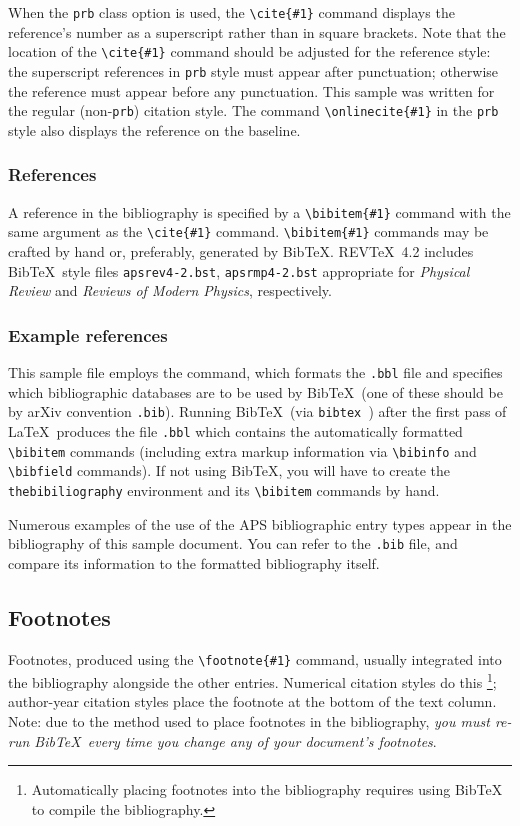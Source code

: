 \documentclass[%
reprint,
amsmath,amssymb,
aps,
]{revtex4-2}
\begin{document}
	When the \verb+prb+ class option is used, the \verb+\cite{#1}+ command
	displays the reference's number as a superscript rather than in
	square brackets. Note that the location of the \verb+\cite{#1}+
	command should be adjusted for the reference style: the superscript
	references in \verb+prb+ style must appear after punctuation;
	otherwise the reference must appear before any punctuation. This
	sample was written for the regular (non-\texttt{prb}) citation style.
	The command \verb+\onlinecite{#1}+ in the \texttt{prb} style also
	displays the reference on the baseline.
	
	\subsubsection{References}
	A reference in the bibliography is specified by a \verb+\bibitem{#1}+ command
	with the same argument as the \verb+\cite{#1}+ command.
	\verb+\bibitem{#1}+ commands may be crafted by hand or, preferably,
	generated by Bib\TeX. 
	REV\TeX~4.2 includes Bib\TeX\ style files
	\verb+apsrev4-2.bst+, \verb+apsrmp4-2.bst+ appropriate for
	\textit{Physical Review} and \textit{Reviews of Modern Physics},
	respectively.
	
	\subsubsection{Example references}
	This sample file employs the \verb++ command, 
	which formats the \texttt{\jobname .bbl} file
	and specifies which bibliographic databases are to be used by Bib\TeX\ 
	(one of these should be by arXiv convention \texttt{\jobname .bib}).
	Running Bib\TeX\ (via \texttt{bibtex \jobname}) 
	after the first pass of \LaTeX\ produces the file
	\texttt{\jobname .bbl} which contains the automatically formatted
	\verb+\bibitem+ commands (including extra markup information via
	\verb+\bibinfo+ and \verb+\bibfield+ commands). 
	If not using Bib\TeX, you will have to create the \verb+thebibiliography+ environment 
	and its \verb+\bibitem+ commands by hand.
	
	Numerous examples of the use of the APS bibliographic entry types appear in the bibliography of this sample document.
	You can refer to the \texttt{\jobname .bib} file, 
	and compare its information to the formatted bibliography itself.
	
	\subsection{Footnotes}%
	Footnotes, produced using the \verb+\footnote{#1}+ command, 
	usually integrated into the bibliography alongside the other entries.
	Numerical citation styles do this%
	\footnote{Automatically placing footnotes into the bibliography requires using BibTeX to compile the bibliography.};
	author-year citation styles place the footnote at the bottom of the text column.
	Note: due to the method used to place footnotes in the bibliography, 
	\emph{you must re-run Bib\TeX\ every time you change any of your document's footnotes}. 
	
\end{document}
